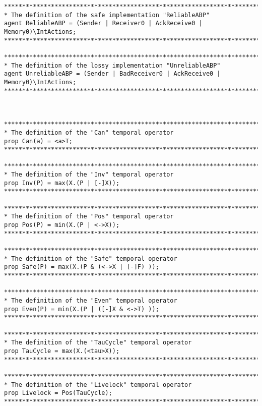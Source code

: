 \begin{lstlisting}[breaklines]
*******************************************************************************
* The definition of the safe implementation "ReliableABP"
agent ReliableABP = (Sender | Receiver0 | AckReceive0 | Memory0)\IntActions;
*******************************************************************************

*******************************************************************************
* The definition of the lossy implementation "UnreliableABP"
agent UnreliableABP = (Sender | BadReceiver0 | AckReceive0 | Memory0)\IntActions;
*******************************************************************************



*******************************************************************************
* The definition of the "Can" temporal operator
prop Can(a) = <a>T;
*******************************************************************************

*******************************************************************************
* The definition of the "Inv" temporal operator
prop Inv(P) = max(X.(P | [-]X));
*******************************************************************************

*******************************************************************************
* The definition of the "Pos" temporal operator
prop Pos(P) = min(X.(P | <->X));
*******************************************************************************

*******************************************************************************
* The definition of the "Safe" temporal operator
prop Safe(P) = max(X.(P & (<->X | [-]F) ));
*******************************************************************************

*******************************************************************************
* The definition of the "Even" temporal operator
prop Even(P) = min(X.(P | ([-]X & <->T) ));
*******************************************************************************

*******************************************************************************
* The definition of the "TauCycle" temporal operator
prop TauCycle = max(X.(<tau>X));
*******************************************************************************

*******************************************************************************
* The definition of the "Livelock" temporal operator
prop Livelock = Pos(TauCycle);
*******************************************************************************


\end{lstlisting}
